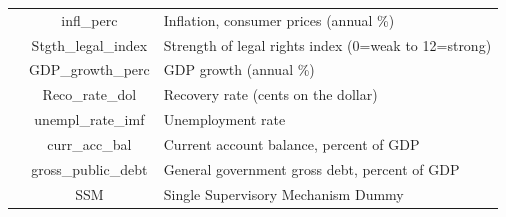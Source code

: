\documentclass[aspectratio=169]{beamer}\usepackage[]{graphicx}\usepackage[]{color}
\begin{document}
{\begin{table}[H]
\begin{threeparttable}
{\begin{tabularx}{.6\textwidth} { c | c X }
         \hline %
                    \parbox[t]{2mm}{}
                    & infl\_perc &  Inflation, consumer prices (annual \%)  \\
                   & Stgth\_legal\_index & Strength of legal rights index (0=weak to 12=strong)\\
                   &GDP\_growth\_perc  & GDP growth (annual \%) \\
                   & Reco\_rate\_dol & Recovery rate (cents on the dollar) \\
                   &unempl\_rate\_imf  & Unemployment rate \\
                    & curr\_acc\_bal  & Current account balance, percent of GDP \\
                     & gross\_public\_debt  & General government gross debt, percent of GDP \\
                      & SSM  & Single Supervisory Mechanism Dummy \\



\end{tabularx}}
\end{threeparttable}
\end{table}}
\end{document}
